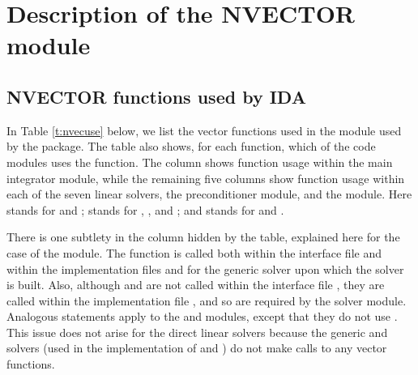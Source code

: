 \chapter{Description of the NVECTOR module}\label{s:nvector}



\section{NVECTOR functions used by IDA}

In Table \ref{t:nvecuse} below, we list the vector functions used in the 
{\nvector} module used by the {\ida} package.
The table also shows, for each function, which of the code modules uses
the function. The {\ida} column shows function usage within the main
integrator module, while the remaining five columns show function usage
within each of the seven {\ida} linear solvers, the {\idabbdpre}
preconditioner module, and the {\fida} module.
Here {\idadls} stands for {\idadense} and {\idaband}; {\idaspils} stands
for {\idaspgmr}, {\idaspbcg}, and {\idasptfqmr}; and {\idasls}
stands for {\idaklu} and {\idasuperlumt}.

There is one subtlety in the {\idaspils} column hidden by the table, explained
here for the case of the {\idaspgmr} module. 
The  function is called both within the interface file
 and within the implementation
files  and  for the generic
{\spgmr} solver upon which the {\idaspgmr} solver is built.  Also, although
 and  are not called within the interface file
, they are called within the implementation file
, and so are required by the {\idaspgmr} solver module.
Analogous statements apply to the {\idaspbcg} and {\idasptfqmr} modules,
except that they do not use .
This issue does not arise for the direct {\ida} linear solvers because
the generic {\dense} and {\band} solvers (used in the implementation of
{\idadense} and {\idaband}) do not make calls to any vector functions.

